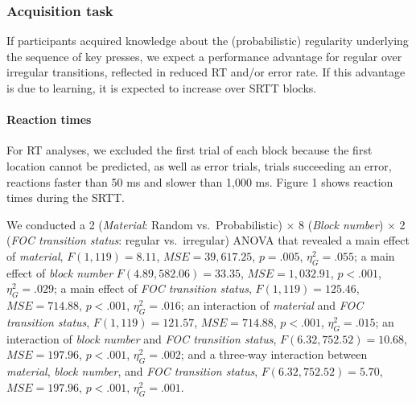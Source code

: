 \documentclass[floatsintext,man]{apa6}
\begin{document}
\subsubsection{Acquisition task}\label{acquisition-task}

If participants acquired knowledge about the (probabilistic) regularity
underlying the sequence of key presses, we expect a performance
advantage for regular over irregular transitions, reflected in reduced
RT and/or error rate. If this advantage is due to learning, it is
expected to increase over SRTT blocks.

\paragraph{Reaction times}\label{reaction-times}



For RT analyses, we excluded the first trial of each block because the
first location cannot be predicted, as well as error trials, trials
succeeding an error, reactions faster than 50 ms and slower than 1,000
ms. Figure 1 shows reaction times during the SRTT.

We conducted a 2 (\emph{Material}: Random vs.~Probabilistic) \(\times\)
8 (\emph{Block number}) \(\times\) 2 (\emph{FOC transition status}:
regular vs.~irregular) ANOVA that revealed a main effect of
\emph{material}, \(F(1, 119) = 8.11\), \(\mathit{MSE} = 39,617.25\),
\(p = .005\), \(\eta^2_G = .055\); a main effect of \emph{block number}
\(F(4.89, 582.06) = 33.35\), \(\mathit{MSE} = 1,032.91\), \(p < .001\),
\(\eta^2_G = .029\); a main effect of \emph{FOC transition status},
\(F(1, 119) = 125.46\), \(\mathit{MSE} = 714.88\), \(p < .001\),
\(\eta^2_G = .016\); an interaction of \emph{material} and \emph{FOC
transition status}, \(F(1, 119) = 121.57\), \(\mathit{MSE} = 714.88\),
\(p < .001\), \(\eta^2_G = .015\); an interaction of \emph{block number}
and \emph{FOC transition status}, \(F(6.32, 752.52) = 10.68\),
\(\mathit{MSE} = 197.96\), \(p < .001\), \(\eta^2_G = .002\); and a
three-way interaction between \emph{material}, \emph{block number}, and
\emph{FOC transition status}, \(F(6.32, 752.52) = 5.70\),
\(\mathit{MSE} = 197.96\), \(p < .001\), \(\eta^2_G = .001\).
\end{document}
